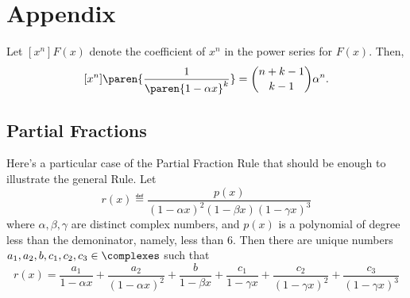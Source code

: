 \documentclass[handout]{mcs}
\begin{document}




\iffalse Explain why partial fractions together with~\eqref{1axk} imply
that there is a closed form expression (allowing binomial coefficients)
for $[x^n]\paren{R(x)/S(x)}$ for arbitrary polynomials $R(x),S(x)$.
\fi



\section*{Appendix}

Let $[x^n]F(x)$ denote the coefficient of $x^n$ in the power series
for $F(x)$.  Then,
\begin{equation}\label{1axk}
[x^n]\paren{\frac{1}{\paren{1-\alpha x}^k}} = \binom{n+k-1}{k-1}\alpha^n.
\end{equation}

\subsection*{Partial Fractions}

Here's a particular case of the Partial Fraction Rule that should be
enough to illustrate the general Rule.  Let
\[
r(x) \eqdef \frac{p(x)}{(1-\alpha x)^2 (1-\beta x) (1-\gamma x)^3}
\]
where $\alpha, \beta, \gamma$ are distinct complex numbers, and $p(x)$ is
a polynomial of degree less than the demoninator, namely, less than 6.
Then there are unique numbers $a_1,a_2,b,c_1,c_2,c_3 \in \complexes$ such
that
\[
r(x)
= \frac{a_1}{1-\alpha x} + \frac{a_2}{(1-\alpha x)^2}
+ \frac{b}{1-\beta x}
+ \frac{c_1}{1-\gamma x} + \frac{c_2}{(1-\gamma x)^2} + \frac{c_3}{(1-\gamma x)^3}
\]

\iffalse
Partial fractions together with~\eqref{1axk} imply that there is a closed
form expression for $[x^n]\paren{R(x)/S(x)}$ for arbitrary polynomials
$R(x),S(x)$.
\fi
\end{document}
